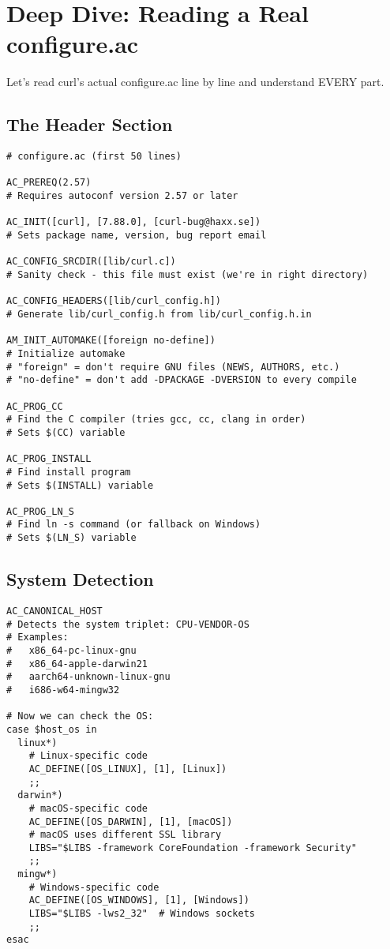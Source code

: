 \section{Deep Dive: Reading a Real configure.ac}

Let's read curl's actual configure.ac line by line and understand EVERY part.

\subsection{The Header Section}

\begin{lstlisting}
# configure.ac (first 50 lines)

AC_PREREQ(2.57)
# Requires autoconf version 2.57 or later

AC_INIT([curl], [7.88.0], [curl-bug@haxx.se])
# Sets package name, version, bug report email

AC_CONFIG_SRCDIR([lib/curl.c])
# Sanity check - this file must exist (we're in right directory)

AC_CONFIG_HEADERS([lib/curl_config.h])
# Generate lib/curl_config.h from lib/curl_config.h.in

AM_INIT_AUTOMAKE([foreign no-define])
# Initialize automake
# "foreign" = don't require GNU files (NEWS, AUTHORS, etc.)
# "no-define" = don't add -DPACKAGE -DVERSION to every compile

AC_PROG_CC
# Find the C compiler (tries gcc, cc, clang in order)
# Sets $(CC) variable

AC_PROG_INSTALL
# Find install program
# Sets $(INSTALL) variable

AC_PROG_LN_S
# Find ln -s command (or fallback on Windows)
# Sets $(LN_S) variable
\end{lstlisting}

\subsection{System Detection}

\begin{lstlisting}
AC_CANONICAL_HOST
# Detects the system triplet: CPU-VENDOR-OS
# Examples:
#   x86_64-pc-linux-gnu
#   x86_64-apple-darwin21
#   aarch64-unknown-linux-gnu
#   i686-w64-mingw32

# Now we can check the OS:
case $host_os in
  linux*)
    # Linux-specific code
    AC_DEFINE([OS_LINUX], [1], [Linux])
    ;;
  darwin*)
    # macOS-specific code
    AC_DEFINE([OS_DARWIN], [1], [macOS])
    # macOS uses different SSL library
    LIBS="$LIBS -framework CoreFoundation -framework Security"
    ;;
  mingw*)
    # Windows-specific code
    AC_DEFINE([OS_WINDOWS], [1], [Windows])
    LIBS="$LIBS -lws2_32"  # Windows sockets
    ;;
esac
\end{lstlisting}

